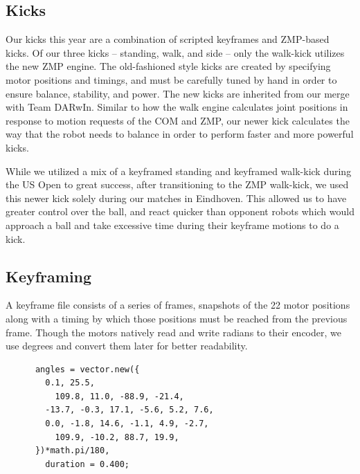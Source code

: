 \documentclass{article}
\begin{document}
  \subsection{Kicks}
	  Our kicks this year are a combination of scripted keyframes and ZMP-based kicks. Of our three kicks -- standing, walk, and side -- only the walk-kick utilizes the new ZMP engine. The old-fashioned style kicks are created by specifying motor positions and timings, and must be carefully tuned by hand in order to ensure balance, stability, and power. The new kicks are inherited from our merge with Team DARwIn. Similar to how the walk engine calculates joint positions in response to motion requests of the COM and ZMP, our newer kick calculates the way that the robot needs to balance in order to perform faster and more powerful kicks.  

	  While we utilized a mix of a keyframed standing and keyframed walk-kick during the US Open to great success, after transitioning to the ZMP walk-kick, we used this newer kick solely during our matches in Eindhoven. This allowed us to have greater control over the ball, and react quicker than opponent robots which would approach a ball and take excessive time during their keyframe motions to do a kick.

  \subsection{Keyframing}
	  A keyframe file consists of a series of frames, snapshots of the 22 motor positions along with a timing by which those positions must be reached from the previous frame. Though the motors natively read and write radians to their encoder, we use degrees and convert them later for better readability.
	  \begin{lstlisting}
  	  angles = vector.new({
	  	0.1, 25.5,
		  109.8, 11.0, -88.9, -21.4,
  		-13.7, -0.3, 17.1, -5.6, 5.2, 7.6,
	  	0.0, -1.8, 14.6, -1.1, 4.9, -2.7,
		  109.9, -10.2, 88.7, 19.9,
  	  })*math.pi/180,
	    duration = 0.400;
	  \end{lstlisting}
\end{document}
